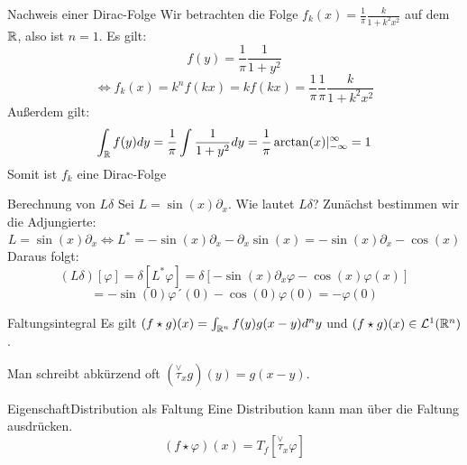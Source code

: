 \begin{Beispiel}{Nachweis einer Dirac-Folge}
Wir betrachten die Folge $f_k(x)=\frac{1}{\pi}\frac{k}{1+k^2x^2}$ auf dem $\mathbb{R}$, also ist $n=1$. Es gilt:
$$f(y)=\frac{1}{\pi}\frac{1}{1+y^2}$$
$$\iff f_k(x)=k^n f(kx) = kf(kx) = \frac{1}{\pi}\frac{1}{\pi}\frac{k}{1+k^2x^2}$$
Außerdem gilt:
$$\int_{\mathbb{R}} f(y) dy = \frac{1}{\pi}\int\frac{1}{1+y^2}dy = \frac{1}{\pi}\arctan(x)|_{-\infty}^{\infty}=1$$
Somit ist $f_k$ eine Dirac-Folge
\end{Beispiel}
\begin{Beispiel}{Berechnung von $L\delta$}
    Sei $L=\sin(x)\partial_x$. Wie lautet $L\delta$? Zunächst bestimmen wir die Adjungierte:
    $$L=\sin(x)\partial_x\iff L^*=-\sin(x)\partial_x-\partial_x\sin(x)=-\sin(x)\partial_x-\cos(x)$$
    Daraus folgt:
    $$(L\delta)[\varphi]=\delta[L^*\varphi]=\delta[-\sin(x)\partial_x\varphi-\cos(x)\varphi(x)]$$
    $$=-\sin(0)\varphi´(0)-\cos(0)\varphi(0)=-\varphi(0)$$
\end{Beispiel}
\begin{Def}{Faltungsintegral}
    Es gilt $(f\star g)(x)=\int_{\mathbb{R}^n}f(y)g(x-y)d^ny$ und $(f\star g)(x)\in \mathcal{L}^1(\mathbb{R}^n)$.
\end{Def}
Man schreibt abkürzend oft $(\overset{\lor}{\tau}_x g)(y)=g(x-y)$.
\begin{Satz}{Eigenschaft}{Distribution als Faltung}
Eine Distribution kann man über die Faltung ausdrücken.
$$(f\star \varphi)(x)=T_f[\overset{\lor}{\tau}_x \varphi]$$
\end{Satz}
